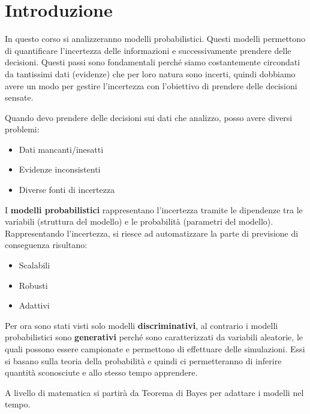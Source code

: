 \chapter{Introduzione}
In questo corso si analizzeranno modelli probabilistici. Questi modelli permettono
di quantificare l'incertezza delle informazioni e successivamente prendere delle
decisioni. Questi passi sono fondamentali perché siamo costantemente circondati
da tantissimi dati (evidenze) che per loro natura sono incerti, quindi dobbiamo
avere un modo per gestire l'incertezza con l'obiettivo di prendere delle
decisioni sensate.

Quando devo prendere delle decisioni sui dati che analizzo, posso avere diversi
problemi:
\begin{itemize}
    \item Dati mancanti/inesatti
    \item Evidenze inconsistenti
    \item Diverse fonti di incertezza
\end{itemize}
I \textbf{modelli probabilistici} rappresentano l'incertezza tramite le dipendenze
tra le variabili (struttura del modello) e le probabilità (parametri del modello).
Rappresentando l'incertezza, si riesce ad automatizzare la parte di previsione
di conseguenza risultano:
\begin{itemize}
    \item Scalabili
    \item Robusti
    \item Adattivi
\end{itemize}

Per ora sono stati visti solo modelli \textbf{discriminativi}, al contrario i
modelli probabilistici sono \textbf{generativi} perché sono caratterizzati da
variabili aleatorie, le quali possono essere campionate e permettono di effettuare
delle simulazioni. Essi si basano sulla teoria della probabilità e quindi ci
permetteranno di inferire quantità sconosciute e allo stesso tempo apprendere.

A livello di matematica si partirà da Teorema di Bayes per adattare i modelli
nel tempo.

